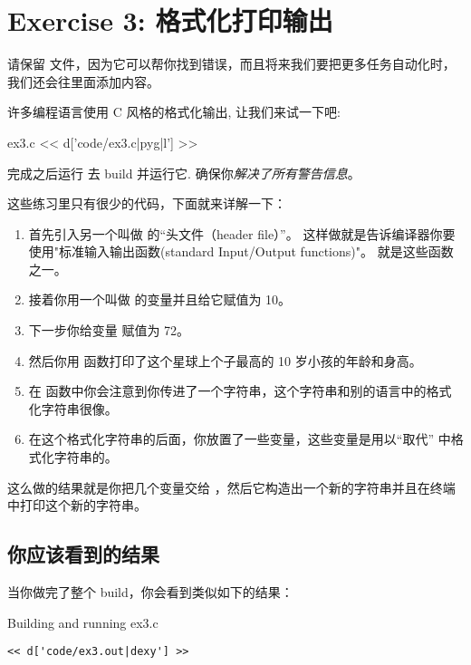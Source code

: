 \chapter{Exercise 3: 格式化打印输出}

请保留   文件，因为它可以帮你找到错误，而且将来我们要把更多任务自动化时，我们还会往里面添加内容。

许多编程语言使用 C 风格的格式化输出, 让我们来试一下吧:

\begin{code}{ex3.c}
<< d['code/ex3.c|pyg|l'] >>
\end{code}

完成之后运行  去 build 并运行它. 
确保你\emph{解决了所有警告信息}。

这些练习里只有很少的代码，下面就来详解一下：

\begin{enumerate}
\item 首先引入另一个叫做  的“头文件（header file）”。 这样做就是告诉编译器你要使用"标准输入输出函数(standard Input/Output functions)"。 就是这些函数之一。
\item 接着你用一个叫做  的变量并且给它赋值为 10。
\item 下一步你给变量  赋值为 72。
\item 然后你用  函数打印了这个星球上个子最高的 10  岁小孩的年龄和身高。
\item 在  函数中你会注意到你传进了一个字符串，这个字符串和别的语言中的格式化字符串很像。
\item 在这个格式化字符串的后面，你放置了一些变量，这些变量是用以“取代”  中格式化字符串的。
\end{enumerate}

这么做的结果就是你把几个变量交给 ，然后它构造出一个新的字符串并且在终端中打印这个新的字符串。

\section{你应该看到的结果}

当你做完了整个 build，你会看到类似如下的结果：

\begin{Terminal}{Building and running ex3.c}
\begin{lstlisting}
<< d['code/ex3.out|dexy'] >>
\end{lstlisting}
\end{Terminal}


